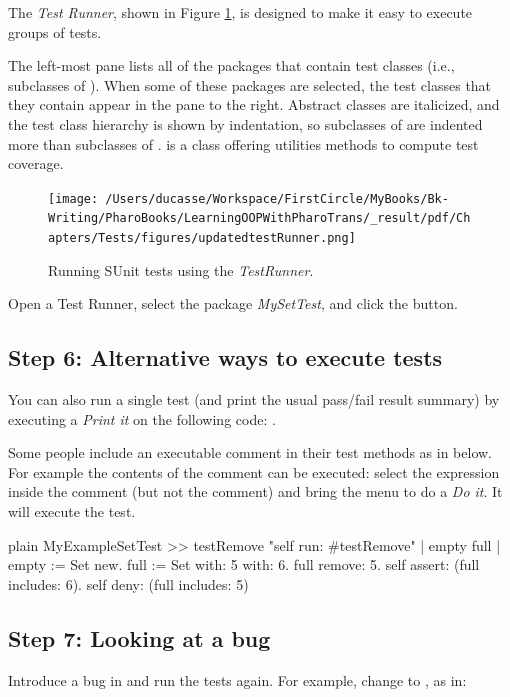 \documentclass[10pt,twoside,english]{_support/latex/sbabook/sbabook}
\begin{document}
The \textit{Test Runner}, shown in Figure \ref{fig:test-runner}, is designed to make it easy to
execute groups of tests.

The left-most pane lists all of the packages that contain test classes (i.e.,
subclasses of ). When some of these packages are selected, the test
classes that they contain appear in the pane to the right. Abstract classes are
italicized, and the test class hierarchy is shown by indentation, so subclasses
of  are indented more than subclasses of .
 is a class offering utilities methods to compute test
coverage.


\begin{figure}

\begin{center}
\texttt{[image: /Users/ducasse/Workspace/FirstCircle/MyBooks/Bk-Writing/PharoBooks/LearningOOPWithPharoTrans/\_result/pdf/Chapters/Tests/figures/updatedtestRunner.png]}\caption{Running SUnit tests using the \textit{TestRunner}.\label{fig:test-runner}}\end{center}
\end{figure}


Open a Test Runner, select the package \textit{MySetTest}, and click the 
button.
\subsection{Step 6: Alternative ways to execute tests}
You can also run a single test (and print the usual pass/fail result summary) by executing a
\textit{Print it} on the following code: .

Some people include an executable comment in their test methods as in  below. For example the contents of the comment  can be executed: select the expression inside the comment (but not the comment) and bring the menu to do a \textit{Do it}.
It will execute the test. 

\begin{displaycode}{plain}
MyExampleSetTest >> testRemove
	"self run: #testRemove"
	| empty full |
	empty := Set new.
	full := Set with: 5 with: 6.
	full remove: 5.
	self assert: (full includes: 6).
	self deny: (full includes: 5)
\end{displaycode}
\subsection{Step 7: Looking at a bug}
Introduce a bug in  and run the tests again. For
example, change  to , as in:
\end{document}
